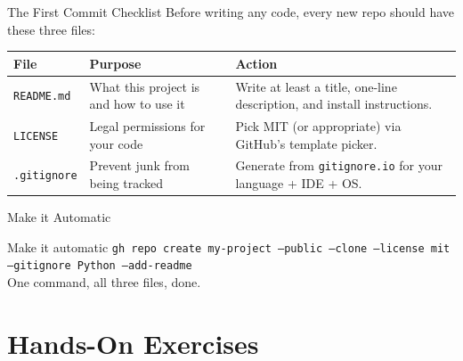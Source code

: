 \documentclass[aspectratio=169, 11pt]{beamer}
\begin{document}
\begin{frame}{The First Commit Checklist}
  Before writing any code, every new repo should have these three files:

  \vspace{0.5em}
  \begin{table}
    \centering
    \begin{tabular}{@{} l l p{7cm} @{}}
      \toprule
      \textbf{File} & \textbf{Purpose} & \textbf{Action} \\
      \midrule
      \texttt{README.md} &
        What this project is and how to use it &
        Write at least a title, one-line description, and install instructions. \\
      \texttt{LICENSE} &
        Legal permissions for your code &
        Pick MIT (or appropriate) via GitHub's template picker. \\
      \texttt{.gitignore} &
        Prevent junk from being tracked &
        Generate from \texttt{gitignore.io} for your language + IDE + OS. \\
      \bottomrule
    \end{tabular}
  \end{table}
\end{frame}

\begin{frame}[fragile]{Make it Automatic}
  \vspace{0.5em}
  \begin{block}{Make it automatic}
    \texttt{gh repo create my-project --public --clone --license mit --gitignore Python --add-readme}\\[3pt]
    One command, all three files, done.
  \end{block}
\end{frame}

\section{Hands-On Exercises}
\end{document}
